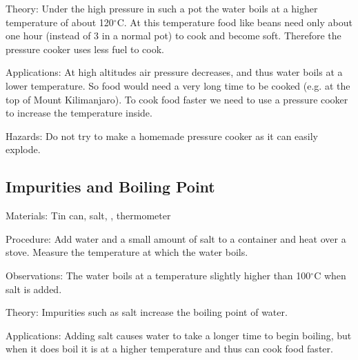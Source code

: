 \begin{multicols}{2}
\begin{description*}
\item[Theory:]{Under the high pressure in such a pot the water boils at a higher temperature of about 120$^\circ$C. At this temperature food like beans need only about one hour (instead of 3 in a normal pot) to cook and become soft. Therefore the pressure cooker uses less fuel to cook.}
\item[Applications:]{At high altitudes air pressure decreases, and thus water boils at a lower temperature. So food would need a very long time to be cooked (e.g. at the top of Mount Kilimanjaro). To cook food faster we need to use a pressure cooker to increase the temperature inside.}
\item[Hazards:]{Do not try to make a homemade pressure cooker as it can easily explode.}
\end{description*}

\subsection{Impurities and Boiling Point}


\begin{description*}
\item[Materials:]{Tin can, salt, , thermometer}
\item[Procedure:]{Add water and a small amount of salt to a container and heat over a stove. Measure the temperature at which the water boils.}
\item[Observations:]{The water boils at a temperature slightly higher than 100$^\circ$C when salt is added.}
\item[Theory:]{Impurities such as salt increase the boiling point of water.}
\item[Applications:]{Adding salt causes water to take a longer time to begin boiling, but when it does boil it is at a higher temperature and thus can cook food faster.}
\end{description*}


\end{multicols}
